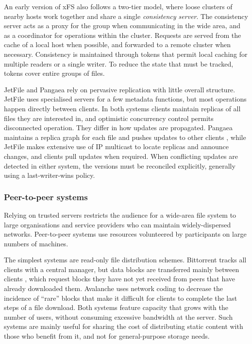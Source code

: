 An early version of xFS \cite{wang93} also follows a two-tier model, where loose clusters of nearby hosts work together and share a single \emph{consistency server}. The consistency server acts as a proxy for the group when communicating in the wide area, and as a coordinator for operations within the cluster. Requests are served from the cache of a local host when possible, and forwarded to a remote cluster when necessary. Consistency is maintained through tokens that permit local caching for multiple readers or a single writer. To reduce the state that must be tracked, tokens cover entire groups of files.

JetFile \cite{gronvall} and Pangaea \cite{saito02a} rely on pervasive replication with little overall structure. JetFile uses specialised servers for a few metadata functions, but most operations happen directly between clients. In both systems clients maintain replicas of all files they are interested in, and optimistic concurrency control permits disconnected operation. They differ in how updates are propagated. Pangaea maintains a replica graph for each file and pushes updates to other clients \cite{saito02b}, while JetFile makes extensive use of IP multicast to locate replicas and announce changes, and clients pull updates when required. When conflicting updates are detected in either system, the versions must be reconciled explicitly, generally using a last-writer-wins policy.

\subsubsection{Peer-to-peer systems}

Relying on trusted servers restricts the audience for a wide-area file system to large organisations and service providers who can maintain widely-dispersed networks. Peer-to-peer systems use resources volunteered by participants on large numbers of machines.

The simplest systems are read-only file distribution schemes. Bittorrent tracks all clients with a central manager, but data blocks are transferred mainly between clients \cite{cohen,pouwelse}, which request blocks they have not yet received from peers that have already downloaded them. Avalanche \cite{gkantsidis} uses network coding to decrease the incidence of ``rare'' blocks that make it difficult for clients to complete the last steps of a file download. Both systems feature capacity that grows with the number of users, without consuming excessive bandwidth at the server. Such systems are mainly useful for sharing the cost of distributing static content with those who benefit from it, and not for general-purpose storage needs.

